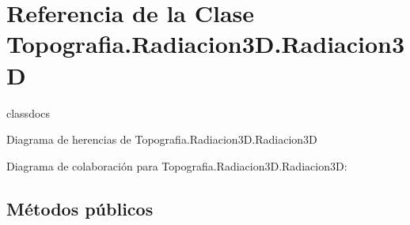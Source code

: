 \section{Referencia de la Clase Topografia.\-Radiacion3\-D.\-Radiacion3\-D}
\label{classTopografia_1_1Radiacion3D_1_1Radiacion3D}


classdocs  




Diagrama de herencias de Topografia.\-Radiacion3\-D.\-Radiacion3\-D


Diagrama de colaboración para Topografia.\-Radiacion3\-D.\-Radiacion3\-D\-:
\subsection*{Métodos públicos}
